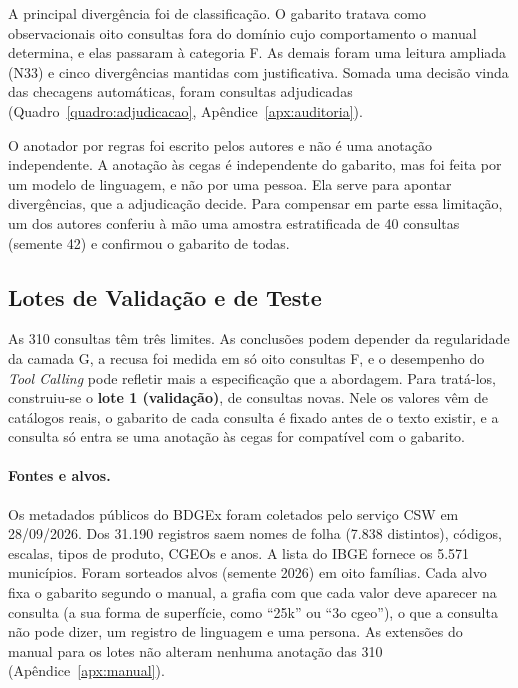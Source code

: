 A principal divergência foi de classificação. O gabarito tratava como observacionais oito consultas fora do domínio cujo comportamento o manual determina, e elas passaram à categoria F. As demais foram uma leitura ampliada (N33) e cinco divergências mantidas com justificativa. Somada uma decisão vinda das checagens automáticas, foram  consultas adjudicadas (Quadro~\ref{quadro:adjudicacao}, Apêndice~\ref{apx:auditoria}).

O anotador por regras foi escrito pelos autores e não é uma anotação independente. A anotação às cegas é independente do gabarito, mas foi feita por um modelo de linguagem, e não por uma pessoa. Ela serve para apontar divergências, que a adjudicação decide. Para compensar em parte essa limitação, um dos autores conferiu à mão uma amostra estratificada de 40 consultas (semente 42) e confirmou o gabarito de todas.

\subsection{Lotes de Validação e de Teste}
\label{sec:lote-validacao}

As 310 consultas têm três limites. As conclusões podem depender da regularidade da camada G, a recusa foi medida em só oito consultas F, e o desempenho do \textit{Tool Calling} pode refletir mais a especificação que a abordagem. Para tratá-los, construiu-se o \textbf{lote 1 (validação)}, de  consultas novas. Nele os valores vêm de catálogos reais, o gabarito de cada consulta é fixado antes de o texto existir, e a consulta só entra se uma anotação às cegas for compatível com o gabarito.

\paragraph{Fontes e alvos.} Os metadados públicos do BDGEx foram coletados pelo serviço CSW em 28/09/2026. Dos 31.190 registros saem nomes de folha (7.838 distintos), códigos, escalas, tipos de produto, CGEOs e anos. A lista do IBGE fornece os 5.571 municípios. Foram sorteados  alvos (semente 2026) em oito famílias. Cada alvo fixa o gabarito segundo o manual, a grafia com que cada valor deve aparecer na consulta (a sua forma de superfície, como ``25k'' ou ``3o cgeo''), o que a consulta não pode dizer, um registro de linguagem e uma persona. As extensões do manual para os lotes não alteram nenhuma anotação das 310 (Apêndice~\ref{apx:manual}).

